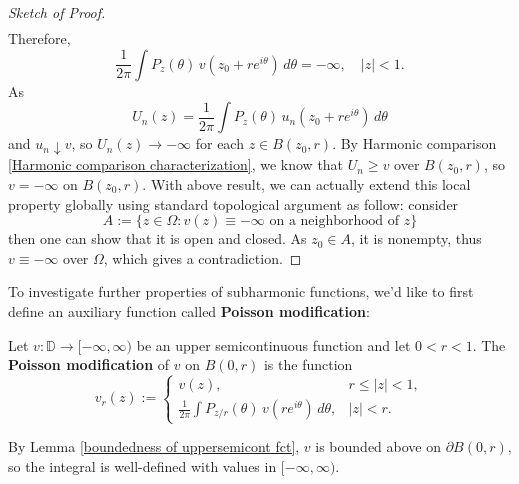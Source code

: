 \begin{proof}[Sketch of Proof]
\begin{align*}
\end{align*}
Therefore,
\begin{equation*}
  \frac{1}{2\pi}\int P_z(\theta)\, v(z_0+re^{i\theta})\, d\theta = -\infty,\quad |z|<1.
\end{equation*}
As
\begin{equation*}
  U_n(z)=\frac{1}{2\pi}\int P_z(\theta)\, u_n(z_0+re^{i\theta})\, d\theta 
\end{equation*}
and $u_n\downarrow v$, so $U_n(z)\rightarrow -\infty$ for each $z\in B(z_0,r)$. By Harmonic
comparison \ref{Harmonic comparison characterization}, we know that $U_n \geq v$ over $B(z_0,r)$,
so $v=-\infty$ on $B(z_0,r)$. With above result, we can actually extend this local property globally
using standard topological argument as follow: consider 
\begin{equation*}
  A:=\{z\in \Omega: v(z)\equiv -\infty\text{ on a neighborhood of }z\}
\end{equation*}
then one can show that it is open and closed. As $z_0\in A$, it is nonempty, thus $v\equiv -\infty$
over $\Omega$, which gives a contradiction.

\end{proof}

To investigate further properties of subharmonic functions, we'd like to first define
an auxiliary function called \textbf{Poisson modification}:
\begin{definition}\label{Poisson modification}
Let $v:\mathbb{D}\rightarrow[-\infty,\infty)$ be an upper semicontinuous function and let
$0<r<1$. The \textbf{Poisson modification} of $v$ on $B(0,r)$ is the function
\begin{equation*}
  v_r(z):=
  \begin{cases}
    v(z), & r\leq|z|<1,\\[4pt]
    \displaystyle\frac{1}{2\pi}\int P_{z/r}(\theta)\, v(re^{i\theta})\, d\theta, & |z|<r.
  \end{cases}
\end{equation*}
\end{definition}
By Lemma \ref{boundedness of uppersemicont fct}, $v$ is bounded above on $\partial B(0,r)$, so
the integral is well-defined with values in $[-\infty,\infty)$.

